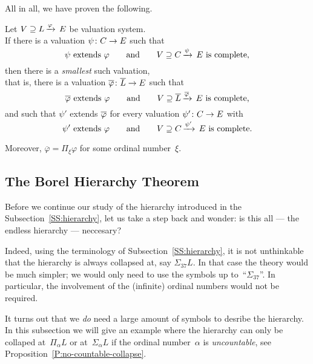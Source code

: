 \documentclass[main.tex]{subfiles}
\begin{document}
All in all, we have proven the following.
\begin{prop}
\label{P:smallest-complete-extension}
Let $V \supseteq L\,\smash{\xrightarrow{\varphi}\,E}$ 
be valuation system.\\
If there is a valuation $\psi\colon C\rightarrow E$ such that
\begin{equation*}
\text{$\psi$ extends~$\varphi$}
\qquad\text{and}\qquad
\text{$V \supseteq C\,\smash{\xrightarrow{\psi}\,E}$ is complete,}
\end{equation*}
then there is a \emph{smallest} such valuation,\\
that is, 
there is a valuation $\overline\varphi\colon \overline{L}\rightarrow E$
such that
\begin{equation*}
\text{$\overline{\varphi}$ extends~$\varphi$}
\qquad\text{and}\qquad
\text{$V \supseteq \overline{L}\,\smash{\xrightarrow{\overline{\varphi}}\,E}$ is complete,}
\end{equation*}
and such that 
$\psi'$ extends $\overline{\varphi}$
 for every valuation $\psi'\colon C\rightarrow E$ with
\begin{equation*}
\text{$\psi'$ extends~$\varphi$}
\qquad\text{and}\qquad
\text{$V \supseteq C\,\smash{\xrightarrow{\psi'}\,E}$ is complete.}
\end{equation*}

Moreover,
$\overline{\varphi} = \Pi_\xi \varphi$
for some ordinal number~$\xi$.
\end{prop}

\clearpage
%
%
\subsection{The Borel Hierarchy Theorem}$\,$\\
\label{SS:borel-hierarchy}%
Before we continue our study of the hierarchy introduced in the
Subsection~\ref{SS:hierarchy}, let us take a step back and wonder: 
 is this all --- the endless hierarchy --- neccesary?

Indeed,
using the terminology of Subsection~\ref{SS:hierarchy},
it is not unthinkable
that the hierarchy is always collapsed
at, say $\Sigma_{37} L$.
In that case 
the theory would be much simpler;
we would only need to
use the symbols up to~``$\Sigma_{37}$''.
In particular,
the involvement of the (infinite) ordinal numbers would not be required.

It turns out that we \emph{do} need a large amount of symbols
to desribe the hierarchy.
In this subsection we will give an example
where the hierarchy can only be collaped at~$\Pi_\alpha L$
or at~$\Sigma_\alpha L$
if the ordinal number~$\alpha$ is \emph{uncountable},
see Proposition~\ref{P:no-countable-collapse}.
\end{document}
